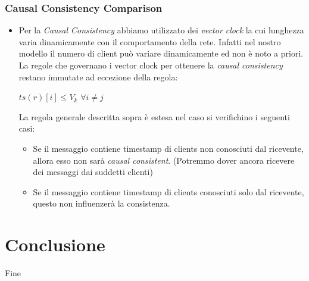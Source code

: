 \documentclass{beamer}
\begin{document}
\begin{frame}
	\frametitle{Causal Consistency Comparison}
	
	\begin{itemize}
		\item Per la \emph{Causal Consistency} abbiamo utilizzato dei \emph{vector clock} la cui lunghezza varia dinamicamente con il comportamento della rete. Infatti nel nostro modello il numero di client può variare dinamicamente ed non è noto a priori. La regole che governano i vector clock per ottenere la \emph{causal consistency} restano immutate ad eccezione della regola:\\
		
		\begin{center}
			$ts\left ( r \right )\left [ i \right ] \leq V_k$  $ \forall i \neq j$
		\end{center}
		
		
		 La regola generale descritta sopra è estesa nel caso si verifichino i seguenti casi:
		\begin{itemize}
			\item Se il messaggio contiene timestamp di clients non conosciuti dal ricevente, allora esso non sarà \emph{causal consistent}. (Potremmo dover ancora ricevere dei messaggi dai suddetti clienti)
			\item Se il messaggio contiene timestamp di clients conosciuti solo dal ricevente, questo non influenzerà la consistenza.
		\end{itemize}
	\end{itemize}
	
\end{frame}

\section{Conclusione}
\begin{frame}
	\Huge{\centerline{Fine}}
\end{frame}

\end{document}

